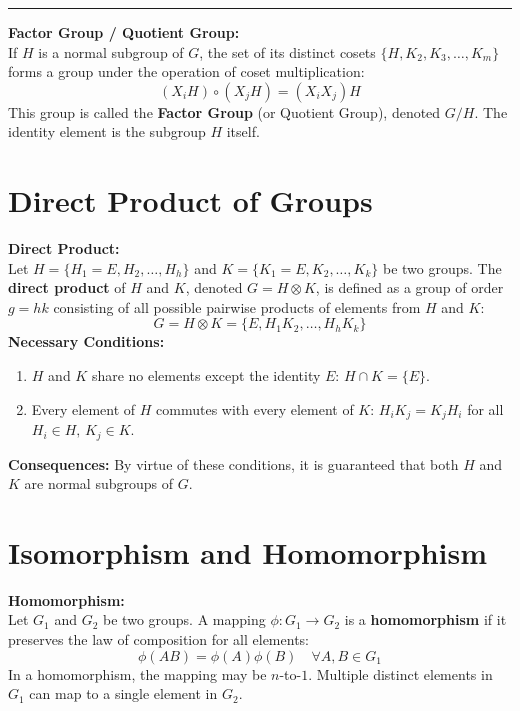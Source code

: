 \documentclass[11pt, a4paper]{report}
\begin{document}
\vspace{1em}
\hrule
\vspace{1em}

\textbf{Factor Group / Quotient Group:} \\
If $H$ is a normal subgroup of $G$, the set of its distinct cosets $\{H, K_2, K_3, \dots, K_m\}$ forms a group under the operation of coset multiplication:
\[ (X_i H) \circ (X_j H) = (X_i X_j) H \]
This group is called the \textbf{Factor Group} (or Quotient Group), denoted $G/H$. The identity element is the subgroup $H$ itself.

\section{Direct Product of Groups}

\textbf{Direct Product:} \\
Let $H = \{H_1 = E, H_2, \dots, H_h\}$ and $K = \{K_1 = E, K_2, \dots, K_k\}$ be two groups. The \textbf{direct product} of $H$ and $K$, denoted $G = H \otimes K$, is defined as a group of order $g = hk$ consisting of all possible pairwise products of elements from $H$ and $K$:
\[ G = H \otimes K = \{E, H_1 K_2, \dots, H_h K_k\} \]
\textbf{Necessary Conditions:}
\begin{enumerate}
    \item $H$ and $K$ share no elements except the identity $E$: $H \cap K = \{E\}$.
    \item Every element of $H$ commutes with every element of $K$: $H_i K_j = K_j H_i$ for all $H_i \in H, \, K_j \in K$.
\end{enumerate}

\vspace{0.5em}
\textbf{Consequences:} By virtue of these conditions, it is guaranteed that both $H$ and $K$ are normal subgroups of $G$.

\section{Isomorphism and Homomorphism}

\textbf{Homomorphism:} \\
Let $G_1$ and $G_2$ be two groups. A mapping $\phi : G_1 \to G_2$ is a \textbf{homomorphism} if it preserves the law of composition for all elements:
\[ \phi(AB) = \phi(A)\phi(B) \quad \forall A, B \in G_1 \]
In a homomorphism, the mapping may be $n$-to-$1$. Multiple distinct elements in $G_1$ can map to a single element in $G_2$.
\end{document}
